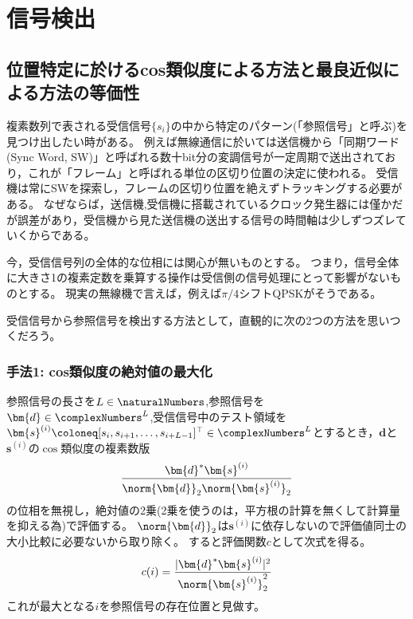 \chapter{信号検出}
    \section{位置特定に於けるcos類似度による方法と最良近似による方法の等価性}
        複素数列で表される受信信号$\{s_i\}$の中から特定のパターン(「参照信号」と呼ぶ)を見つけ出したい時がある。
        例えば無線通信に於いては送信機から「同期ワード(Sync Word, SW)」と呼ばれる数十bit分の変調信号が一定周期で送出されており，これが「フレーム」と呼ばれる単位の区切り位置の決定に使われる。
        受信機は常にSWを探索し，フレームの区切り位置を絶えずトラッキングする必要がある。
        なぜならば，送信機,受信機に搭載されているクロック発生器には僅かだが誤差があり，受信機から見た送信機の送出する信号の時間軸は少しずつズレていくからである。
        \par
        今，受信信号列の全体的な位相には関心が無いものとする。
        つまり，信号全体に大きさ1の複素定数を乗算する操作は受信側の信号処理にとって影響がないものとする。
        現実の無線機で言えば，例えば$\pi/4$シフトQPSKがそうである。
        \par
        受信信号から参照信号を検出する方法として，直観的に次の2つの方法を思いつくだろう。
        \subsection{手法1: cos類似度の絶対値の最大化}
            \label{手法1: cos類似度の絶対値の最大化}
            参照信号の長さを$L\in\naturalNumbers$,参照信号を$\bm{d} \in \complexNumbers^L$,受信信号中のテスト領域を$\bm{s}^{(i)} \coloneq [s_i,s_{i+1},\dots,s_{i+L-1}]^\top \in \complexNumbers^L$とするとき，$\bm{d}$と$\bm{s}^{(i)}$の$\cos$類似度の複素数版
            \[ \frac{\bm{d}^*\bm{s}^{(i)}}{\norm{\bm{d}}_2\norm{\bm{s}^{(i)}}_2} \]
            の位相を無視し，絶対値の2乗(2乗を使うのは，平方根の計算を無くして計算量を抑える為)で評価する。
            $\norm{\bm{d}}_2$は$\bm{s}^{(i)}$に依存しないので評価値同士の大小比較に必要ないから取り除く。
            すると評価関数$c$として次式を得る。
            \[ c(i) = \frac{|\bm{d}^*\bm{s}^{(i)}|^2}{\norm{\bm{s}^{(i)}}_2^2} \]
            これが最大となる$i$を参照信号の存在位置と見做す。

